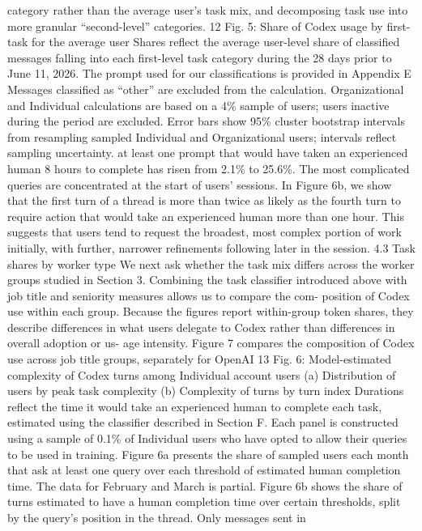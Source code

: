 category rather than the average user’s task mix, and decomposing task use into more granular “second-level” categories.
12
Fig. 5: Share of Codex usage by first-task for the average user
Shares reflect the average user-level share of classified messages falling into each first-level task category during the 28 days
prior to June 11, 2026. The prompt used for our classifications is provided in Appendix E Messages classified as “other” are
excluded from the calculation. Organizational and Individual calculations are based on a 4\% sample of users; users inactive
during the period are excluded. Error bars show 95\% cluster bootstrap intervals from resampling sampled Individual and
Organizational users; intervals reflect sampling uncertainty.
at least one prompt that would have taken an experienced human 8 hours to complete has risen from
2.1\% to 25.6\%.
The most complicated queries are concentrated at the start of users’ sessions. In Figure 6b, we show
that the first turn of a thread is more than twice as likely as the fourth turn to require action that would
take an experienced human more than one hour. This suggests that users tend to request the broadest,
most complex portion of work initially, with further, narrower refinements following later in the session.
4.3
Task shares by worker type
We next ask whether the task mix differs across the worker groups studied in Section 3. Combining the
task classifier introduced above with job title and seniority measures allows us to compare the com-
position of Codex use within each group. Because the figures report within-group token shares, they
describe differences in what users delegate to Codex rather than differences in overall adoption or us-
age intensity.
Figure 7 compares the composition of Codex use across job title groups, separately for OpenAI
13
Fig. 6: Model-estimated complexity of Codex turns among Individual account users
(a) Distribution of users by peak task complexity
(b) Complexity of turns by turn index
Durations reflect the time it would take an experienced human to complete each task, estimated using the classifier described
in Section F. Each panel is constructed using a sample of 0.1\% of Individual users who have opted to allow their queries to be
used in training. Figure 6a presents the share of sampled users each month that ask at least one query over each threshold of
estimated human completion time. The data for February and March is partial. Figure 6b shows the share of turns estimated
to have a human completion time over certain thresholds, split by the query’s position in the thread. Only messages sent in
